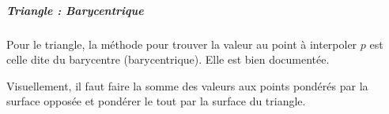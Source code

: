 \subparagraph{Triangle : Barycentrique}

Pour le triangle, la méthode pour trouver la valeur au point à interpoler \( p \) est celle dite du barycentre (barycentrique).
Elle est bien documentée.

Visuellement, il faut faire la somme des valeurs aux points pondérés par la surface opposée et pondérer le tout par la surface du triangle.

